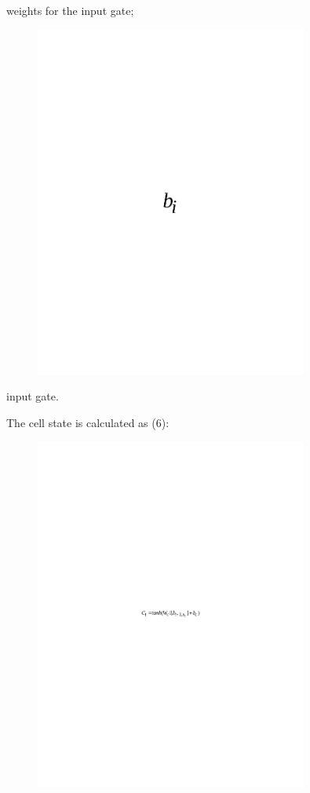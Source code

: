 weights for the input gate;
\begin{figure}[H]
	\centering
	\includegraphics[width=0.8\textwidth]{media/ict/image55}
	\caption*{}
\end{figure}

input gate.

The cell state is calculated as (6):

\begin{figure}[H]
	\centering
	\includegraphics[width=0.8\textwidth]{media/ict/image56}
	\caption*{}
\end{figure}



